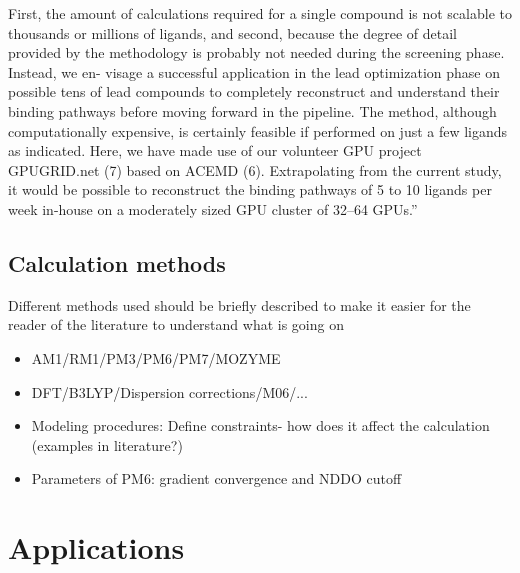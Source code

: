 \begin{itemize}
{First, the amount of calculations required for a single compound is not scalable to thousands or millions of ligands, and second, because the degree of detail provided by the methodology is probably not needed during the screening phase.
Instead, we en- visage a successful application in the lead optimization phase on possible tens of lead compounds to completely reconstruct and understand their binding pathways before moving forward in the pipeline.
The method, although computationally expensive, is certainly feasible if performed on just a few ligands as indicated.
Here, we have made use of our volunteer GPU project GPUGRID.net (7) based on ACEMD (6).
Extrapolating from the current study, it would be possible to reconstruct the binding pathways of 5 to 10 ligands per week in-house on a moderately sized GPU cluster of 32–64 GPUs.}''\cite{buch2011complete}
\end{itemize}

\subsection{Calculation methods}
Different methods used should be briefly described to make it easier for the reader of the literature to understand what is going on
\begin{itemize}
\item AM1/RM1/PM3/PM6/PM7/MOZYME
\item DFT/B3LYP/Dispersion corrections/M06/...
\item Modeling procedures: Define constraints- how does it affect the calculation (examples in literature?)
\item Parameters of PM6: gradient convergence and NDDO cutoff
\end{itemize}


\section{Applications}\label{sec:apps}

